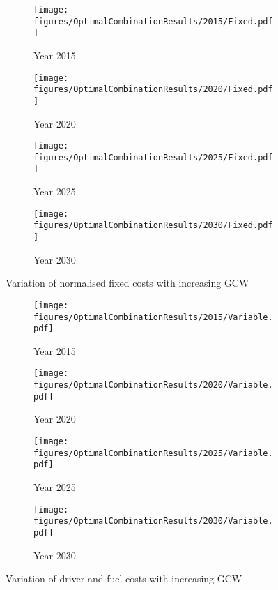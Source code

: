 \documentclass[ExampleMasters.tex]{subfiles}
\begin{document}
	\begin{figure}[ht!]
		\begin{subfigure}{.5\textwidth}
			\centering
			\texttt{[image: figures/OptimalCombinationResults/2015/Fixed.pdf]}
			\caption{Year 2015}
		\end{subfigure}
		\begin{subfigure}{.5\textwidth}
			\centering
			\texttt{[image: figures/OptimalCombinationResults/2020/Fixed.pdf]}
			\caption{Year 2020}
		\end{subfigure}
		\begin{subfigure}{.5\textwidth}
			\centering
			\texttt{[image: figures/OptimalCombinationResults/2025/Fixed.pdf]}
			\caption{Year 2025}
		\end{subfigure}
		\begin{subfigure}{.5\textwidth}
			\centering
			\texttt{[image: figures/OptimalCombinationResults/2030/Fixed.pdf]}
			\caption{Year 2030}
		\end{subfigure}
		\caption{Variation of normalised fixed costs with increasing GCW}
		\label{fixedCostVsGCWOverYears}
	\end{figure}

	\newpage

	\begin{figure}[ht!]
		\begin{subfigure}{.5\textwidth}
			\centering
			\texttt{[image: figures/OptimalCombinationResults/2015/Variable.pdf]}
			\caption{Year 2015}
		\end{subfigure}
		\begin{subfigure}{.5\textwidth}
			\centering
			\texttt{[image: figures/OptimalCombinationResults/2020/Variable.pdf]}
			\caption{Year 2020}
		\end{subfigure}
		\begin{subfigure}{.5\textwidth}
			\centering
			\texttt{[image: figures/OptimalCombinationResults/2025/Variable.pdf]}
			\caption{Year 2025}
		\end{subfigure}
		\begin{subfigure}{.5\textwidth}
			\centering
			\texttt{[image: figures/OptimalCombinationResults/2030/Variable.pdf]}
			\caption{Year 2030}
		\end{subfigure}
		\caption{Variation of driver and fuel costs with increasing GCW}
		\label{variableCostVsGCWOverYears}
	\end{figure}
\end{document}
